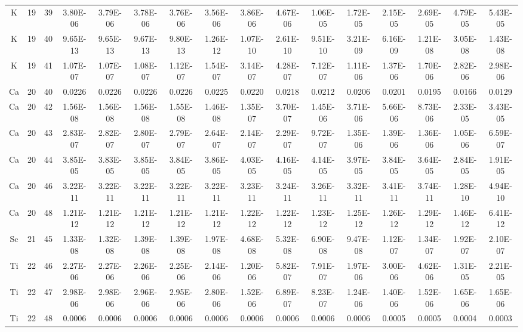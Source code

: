 {\begin{tabular}{|c|c|c|c|c|c|c|c|c|c|c|c|c|c|c|c|}
K  & 19 & 39   & 3.80E-06 & 3.79E-06 & 3.78E-06 & 3.76E-06 & 3.56E-06 & 3.86E-06 & 4.67E-06 & 1.06E-05 & 1.72E-05 & 2.15E-05 & 2.69E-05 & 4.79E-05 & 5.43E-05 \\
K  & 19 & 40   & 9.65E-13 & 9.65E-13 & 9.67E-13 & 9.80E-13 & 1.26E-12 & 1.07E-10 & 2.61E-10 & 9.51E-10 & 3.21E-09 & 6.16E-09 & 1.21E-08 & 3.05E-08 & 1.43E-08 \\
K  & 19 & 41   & 1.07E-07 & 1.07E-07 & 1.08E-07 & 1.12E-07 & 1.54E-07 & 3.14E-07 & 4.28E-07 & 7.12E-07 & 1.11E-06 & 1.37E-06 & 1.70E-06 & 2.82E-06 & 2.98E-06 \\
Ca & 20 & 40   & 0.0226   & 0.0226   & 0.0226   & 0.0226   & 0.0225   & 0.0220   & 0.0218   & 0.0212   & 0.0206   & 0.0201   & 0.0195   & 0.0166   & 0.0129   \\
Ca & 20 & 42   & 1.56E-08 & 1.56E-08 & 1.56E-08 & 1.55E-08 & 1.46E-08 & 1.35E-07 & 3.70E-07 & 1.45E-06 & 3.71E-06 & 5.66E-06 & 8.73E-06 & 2.33E-05 & 3.43E-05 \\
Ca & 20 & 43   & 2.83E-07 & 2.82E-07 & 2.80E-07 & 2.79E-07 & 2.64E-07 & 2.14E-07 & 2.29E-07 & 9.72E-07 & 1.35E-06 & 1.39E-06 & 1.36E-06 & 1.05E-06 & 6.59E-07 \\
Ca & 20 & 44   & 3.85E-05 & 3.83E-05 & 3.85E-05 & 3.84E-05 & 3.86E-05 & 4.03E-05 & 4.16E-05 & 4.14E-05 & 3.97E-05 & 3.84E-05 & 3.64E-05 & 2.84E-05 & 1.91E-05 \\
Ca & 20 & 46   & 3.22E-11 & 3.22E-11 & 3.22E-11 & 3.22E-11 & 3.22E-11 & 3.23E-11 & 3.24E-11 & 3.26E-11 & 3.32E-11 & 3.41E-11 & 3.74E-11 & 1.28E-10 & 4.94E-10 \\
Ca & 20 & 48   & 1.21E-12 & 1.21E-12 & 1.21E-12 & 1.21E-12 & 1.21E-12 & 1.22E-12 & 1.22E-12 & 1.23E-12 & 1.25E-12 & 1.26E-12 & 1.29E-12 & 1.46E-12 & 6.41E-12 \\
Sc & 21 & 45   & 1.33E-08 & 1.32E-08 & 1.39E-08 & 1.39E-08 & 1.97E-08 & 4.68E-08 & 5.32E-08 & 6.90E-08 & 9.47E-08 & 1.12E-07 & 1.34E-07 & 1.92E-07 & 2.10E-07 \\
Ti & 22 & 46   & 2.27E-06 & 2.27E-06 & 2.26E-06 & 2.25E-06 & 2.14E-06 & 1.20E-06 & 5.82E-07 & 7.91E-07 & 1.97E-06 & 3.00E-06 & 4.62E-06 & 1.31E-05 & 2.21E-05 \\
Ti & 22 & 47   & 2.98E-06 & 2.98E-06 & 2.96E-06 & 2.95E-06 & 2.80E-06 & 1.52E-06 & 6.89E-07 & 8.23E-07 & 1.24E-06 & 1.40E-06 & 1.52E-06 & 1.65E-06 & 1.65E-06 \\
Ti & 22 & 48   & 0.0006   & 0.0006   & 0.0006   & 0.0006   & 0.0006   & 0.0006   & 0.0006   & 0.0006   & 0.0006   & 0.0005   & 0.0005   & 0.0004   & 0.0003   \\

\end{tabular}}

